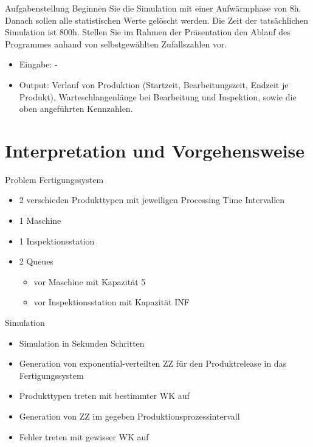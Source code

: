 \begin{frame}{Aufgabenstellung}
Beginnen Sie die Simulation mit einer Aufwärmphase von 8h. Danach sollen alle statistischen
Werte gelöscht werden. Die Zeit der tatsächlichen Simulation ist 800h. Stellen Sie
im Rahmen der Präsentation den Ablauf des Programmes anhand von selbstgewählten
Zufallszahlen vor.

\begin{itemize}
  \item Eingabe: -
  \item Output: Verlauf von Produktion (Startzeit, Bearbeitungszeit, Endzeit je Produkt),
Warteschlangenlänge bei Bearbeitung und Inspektion, sowie die oben angeführten
Kennzahlen.
\end{itemize}
\end{frame}

\section{Interpretation und Vorgehensweise}
\begin{frame}{Problem Fertigungssystem}
\begin{itemize}
  \item 2 verschieden Produkttypen mit jeweiligen Processing Time Intervallen
  \item 1 Maschine
  \item 1 Inspektionsstation
  \item 2 Queues	
  \begin{itemize}
  	\item vor Maschine mit Kapazität 5
  	\item vor Inspektionsstation mit Kapazität INF
  \end{itemize}
\end{itemize}
\end{frame}

\begin{frame}{Simulation}
\begin{itemize}
  \item Simulation in Sekunden Schritten
  \item Generation von exponential-verteilten ZZ für den Produktrelease in das Fertigungssystem
  \item Produkttypen treten mit bestimmter WK auf
  \item Generation von ZZ im gegeben Produktionsprozessintervall
  \item Fehler treten mit gewisser WK auf
\end{itemize}
\end{frame}


